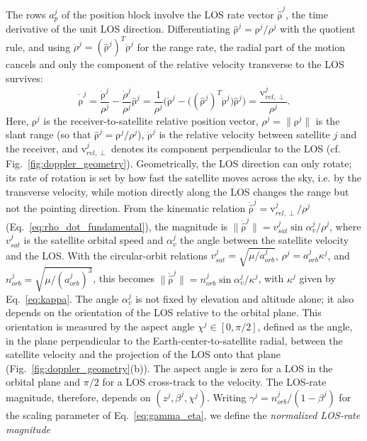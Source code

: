 \documentclass[letterpaper,times]{IONconf-v2}
\theoremstyle{plain}
\theoremstyle{remark}
\renewcommand{\vec}[1]{{\boldsymbol{\mathrm{#1}}}}
\begin{document}
The rows $a_p^j$ of the position block involve the LOS rate vector $\dot{\hat{\vec\rho}}^j$, the time derivative of the unit LOS direction. Differentiating $\hat{\vec\rho}^j = \vec\rho^j/\rho^j$ with the quotient rule, and using $\dot\rho^j = (\hat{\vec\rho}^j)^T\dot{\vec\rho}^j$ for the range rate, the radial part of the motion cancels and only the component of the relative velocity transverse to the LOS survives:
\begin{equation}\label{eq:rho_dot_fundamental}
    \dot{\hat{\vec\rho}}^j
    = \frac{\dot{\vec\rho}^j}{\rho^j} - \frac{\dot\rho^j}{\rho^j}\hat{\vec\rho}^j
    = \frac{1}{\rho^j}\Big(\dot{\vec\rho}^j - \big((\hat{\vec\rho}^j)^T \dot{\vec\rho}^j\big)\hat{\vec\rho}^j\Big)
    = \frac{\vec{v}_{rel,\perp}^j}{\rho^j} .
\end{equation}
Here, $\vec\rho^j$ is the receiver-to-satellite relative position vector, $\rho^j = \|\vec\rho^j\|$ is the slant range (so that $\hat{\vec\rho}^j = \vec\rho^j/\rho^j$), $\dot{\vec\rho}^j$ is the relative velocity between satellite $j$ and the receiver, and $\vec{v}_{rel,\perp}^j$ denotes its component perpendicular to the LOS (cf. Fig.~\ref{fig:doppler_geometry}).  Geometrically, the LOS direction can only rotate; its rate of rotation is set by how fast the satellite moves across the sky, i.e. by the transverse velocity, while motion directly along the LOS changes the range but not the pointing direction. From the kinematic relation $\dot{\hat{\vec\rho}}^j = \vec v_{rel,\perp}^j/\rho^j$ (Eq.~\eqref{eq:rho_dot_fundamental}), the magnitude is $\|\dot{\hat{\vec\rho}}^j\| = v_{sat}^j\sin\alpha_v^j/\rho^j$, where $v_{sat}^j$ is the satellite orbital speed and $\alpha_v^j$ the angle between the satellite velocity and the LOS. With the circular-orbit relations $v_{sat}^j = \sqrt{\mu/a_{orb}^j}$, $\rho^j = a_{orb}^j\kappa^j$, and $n_{orb}^j = \sqrt{\mu/(a_{orb}^j)^3}$, this becomes $\|\dot{\hat{\vec\rho}}^j\| = n_{orb}^j\sin\alpha_v^j/\kappa^j$, with $\kappa^j$ given by Eq.~\eqref{eq:kappa}. The angle $\alpha_v^j$ is not fixed by elevation and altitude alone; it also depends on the orientation of the LOS relative to the orbital plane. This orientation is measured by the aspect angle $\chi^j\in[0,\pi/2]$, defined as the angle, in the plane perpendicular to the Earth-center-to-satellite radial, between the satellite velocity and the projection of the LOS onto that plane (Fig.~\ref{fig:doppler_geometry}(b)). The aspect angle is zero for a LOS in the orbital plane and $\pi/2$ for a LOS cross-track to the velocity. The LOS-rate magnitude, therefore, depends on $(z^j,\beta^j,\chi^j)$. Writing $\gamma^j = n_{orb}^j/(1-\beta^j)$ for the scaling parameter of Eq.~\eqref{eq:gamma_eta}, we define the \emph{normalized LOS-rate magnitude}
\end{document}
